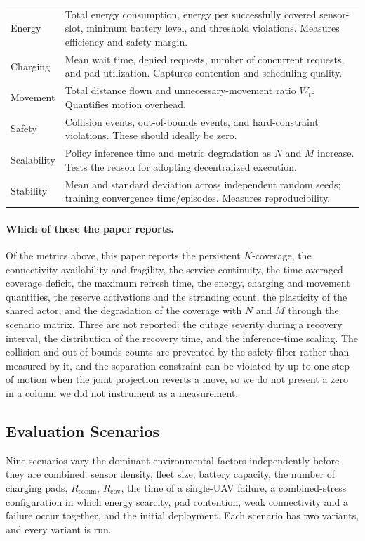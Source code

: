 \documentclass[conference]{IEEEtran}
\begin{document}
\begin{table}[t]
\begin{tabularx}{\columnwidth}{@{}p{1.35cm}Y@{}}
Energy & Total energy consumption, energy per successfully covered sensor-slot, minimum battery level, and threshold violations. Measures efficiency and safety margin. \\
Charging & Mean wait time, denied requests, number of concurrent requests, and pad utilization. Captures contention and scheduling quality. \\
Movement & Total distance flown and unnecessary-movement ratio $W_t$. Quantifies motion overhead. \\
Safety & Collision events, out-of-bounds events, and hard-constraint violations. These should ideally be zero. \\
Scalability & Policy inference time and metric degradation as $N$ and $M$ increase. Tests the reason for adopting decentralized execution. \\
Stability & Mean and standard deviation across independent random seeds; training convergence time/episodes. Measures reproducibility. \\
\bottomrule
\end{tabularx}
\end{table}

\paragraph{Which of these the paper reports.} Of the metrics above, this
paper reports the persistent $K$-coverage, the connectivity availability
and fragility, the service continuity, the time-averaged coverage deficit,
the maximum refresh time, the energy, charging and movement quantities, the
reserve activations and the stranding count, the plasticity of the shared
actor, and the degradation of the coverage with $N$ and $M$ through the
scenario matrix.  Three are not reported: the outage severity during a
recovery interval, the distribution of the recovery time, and the
inference-time scaling.  The collision and out-of-bounds counts are
prevented by the safety filter rather than measured by it, and the
separation constraint can be violated by up to one step of motion when the
joint projection reverts a move, so we do not present a zero in a column we
did not instrument as a measurement.

\subsection{Evaluation Scenarios}
Nine scenarios vary the dominant environmental factors independently before they are combined: sensor density, fleet size, battery capacity, the number of charging pads, $R_{\mathrm{comm}}$, $R_{\mathrm{cov}}$, the time of a single-UAV failure, a combined-stress configuration in which energy scarcity, pad contention, weak connectivity and a failure occur together, and the initial deployment.  Each scenario has two variants, and every variant is run.
\end{document}

